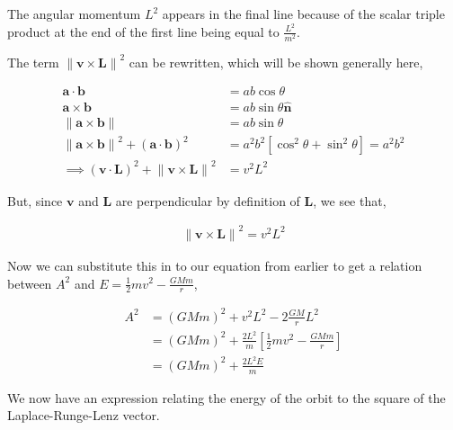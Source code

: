 \documentclass[11pt]{amsart}
\begin{document}
The angular momentum $L^2$ appears in the final line because of the scalar triple product at the end of the first line being equal to $\frac{L^2}{m^2}$.

The term ${\|\mathbf{v}\times\mathbf{L}\|}^2$ can be rewritten, which will be shown generally here,

\begin{align*}
  \mathbf{a}\cdot\mathbf{b} &= ab\cos{\theta} \\
  \mathbf{a}\times\mathbf{b} &= ab\sin{\theta} \mathbf{\hat{n}} \\
  \|\mathbf{a}\times\mathbf{b}\| &= ab\sin{\theta} \\
  {\|\mathbf{a}\times\mathbf{b}\|}^2 + {\left(\mathbf{a}\cdot\mathbf{b}\right)}^2 &= a^2b^2\left[\cos^2\theta + \sin^2\theta\right] = a^2b^2 \\
  \implies{\left(\mathbf{v}\cdot\mathbf{L}\right)}^2 + {\|\mathbf{v}\times\mathbf{L}\|}^2 &= v^2L^2
\end{align*}

But, since $\mathbf{v}$ and $\mathbf{L}$ are perpendicular by definition of $\mathbf{L}$, we see that,

\begin{align*}
  {\|\mathbf{v}\times\mathbf{L}\|}^2 = v^2L^2
\end{align*}

Now we can substitute this in to our equation from earlier to get a relation between $A^2$ and $E = \frac{1}{2}mv^2 - \frac{GMm}{r}$,

\begin{align*}
  A^2 &= {\left(GMm\right)}^2 + v^2L^2 - 2\frac{GM}{r}L^2 \\
      &= {\left(GMm\right)}^2 + \frac{2L^2}{m} \left[\frac{1}{2}mv^2 - \frac{GMm}{r}\right] \\
      &= {\left(GMm\right)}^2 + \frac{2L^2E}{m}
\end{align*}

We now have an expression relating the energy of the orbit to the square of the Laplace-Runge-Lenz vector.
\end{document}
